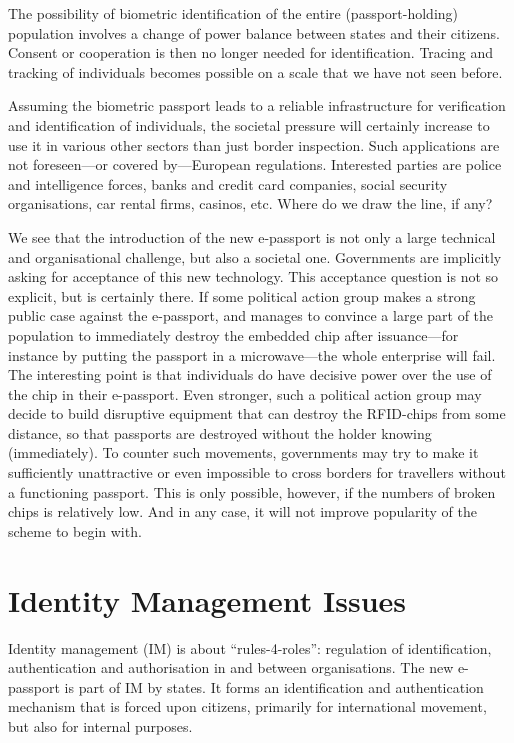 \documentclass[runningheads,envcountsame,envcountsect,oribibl]{llncs}
\begin{document}
The possibility of biometric identification of the entire
(passport-holding) population involves a change of power balance
between states and their citizens. Consent or cooperation is then no
longer needed for identification. Tracing and tracking of
individuals becomes possible on a scale that we have not seen before.




Assuming the biometric passport leads to a reliable infrastructure for
verification and identification of individuals, the societal pressure
will certainly increase to use it in various other sectors than just
border inspection. Such applications are not foreseen---or covered
by---European regulations. Interested parties are police and
intelligence forces, banks and credit card companies, social security
organisations, car rental firms, casinos, etc. Where do we
draw the line, if any?

We see that the introduction of the new e-passport is not only a large
technical and organisational challenge, but also a societal
one. Governments are implicitly asking for acceptance of this
new technology. This acceptance question is not so explicit, but
is certainly there. If some political action group makes a strong
public case against the e-passport, and manages to convince a large
part of the population to immediately destroy the embedded chip
after issuance---for instance by putting the passport in
a microwave---the whole enterprise will fail. The interesting
point is that individuals do have decisive power over
the use of the chip in their e-passport.
Even stronger, such a political action group may decide to
build disruptive equipment that can destroy the RFID-chips
from some distance, so that passports are destroyed without
the holder knowing (immediately).
To counter such movements, governments may try to make it
sufficiently unattractive or even impossible
to cross borders for travellers without a functioning passport. This
is only possible, however, if the numbers of broken chips is relatively low. 
And in any case, it will not improve popularity of the scheme to begin with.



\section{Identity Management Issues}
\label{sec-im}

Identity management (IM) is about ``rules-4-roles'': regulation of
identification, authentication and authorisation in and between
organisations. The new e-passport is part of IM by states. It forms an
identification and authentication mechanism that is forced upon
citizens, primarily for international movement, but also for internal
purposes. 
\end{document}
